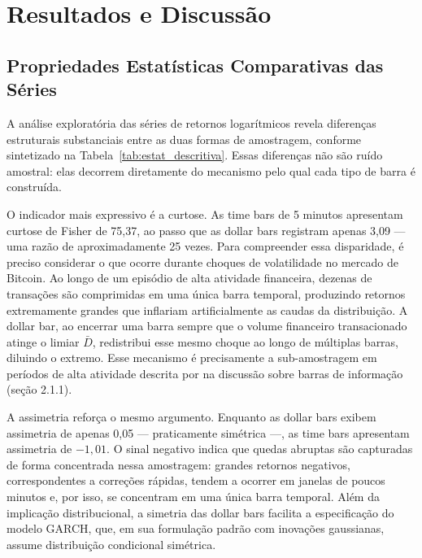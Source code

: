 
\chapter{Resultados e Discussão}
\label{cap:resultados}

\section{Propriedades Estatísticas Comparativas das Séries}
\label{sec:prop_estatisticas}

A análise exploratória das séries de retornos logarítmicos revela diferenças estruturais
substanciais entre as duas formas de amostragem, conforme sintetizado na Tabela~\ref{tab:estat_descritiva}.
Essas diferenças não são ruído amostral: elas decorrem diretamente do mecanismo pelo qual
cada tipo de barra é construída.

O indicador mais expressivo é a curtose. As time bars de 5 minutos apresentam curtose de Fisher
de 75,37, ao passo que as dollar bars registram apenas 3,09 — uma razão de aproximadamente
25 vezes. Para compreender essa disparidade, é preciso considerar o que ocorre durante
choques de volatilidade no mercado de Bitcoin. Ao longo de um episódio de alta atividade
financeira, dezenas de transações são comprimidas em uma única barra temporal, produzindo
retornos extremamente grandes que inflariam artificialmente as caudas da distribuição.
A dollar bar, ao encerrar uma barra sempre que o volume financeiro transacionado atinge o
limiar $\bar{D}$, redistribui esse mesmo choque ao longo de múltiplas barras, diluindo o
extremo. Esse mecanismo é precisamente a sub-amostragem em períodos de alta atividade
descrita por \citet{Prado2018} na discussão sobre barras de informação (seção 2.1.1).

A assimetria reforça o mesmo argumento. Enquanto as dollar bars exibem assimetria de apenas
0,05 — praticamente simétrica —, as time bars apresentam assimetria de $-1{,}01$. O sinal
negativo indica que quedas abruptas são capturadas de forma concentrada nessa amostragem:
grandes retornos negativos, correspondentes a correções rápidas, tendem a ocorrer em janelas
de poucos minutos e, por isso, se concentram em uma única barra temporal. Além da implicação
distribucional, a simetria das dollar bars facilita a especificação do modelo GARCH, que,
em sua formulação padrão com inovações gaussianas, assume distribuição condicional simétrica.

